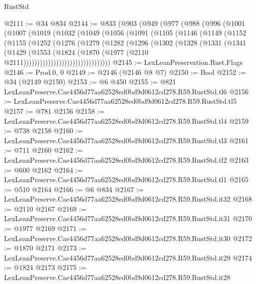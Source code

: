 \begin{lexlean}{RustStd}
\begin{coremodule}
@2111 := @34 @834
@2144 := @833
    (@903
      (@949
        (@977
          (@988
            (@996
              (@1001
                (@1007
                  (@1019
                    (@1032
                      (@1049
                        (@1056
                          (@1091
                            (@1105
                              (@1146
                                (@1149
                                  (@1152
                                    (@1155
                                      (@1252
                                        (@1276
                                          (@1279
                                            (@1282
                                              (@1296
                                                (@1302
                                                  (@1328
                                                    (@1331
                                                      (@1341
                                                        (@1429
                                                          (@1553
                                                            (@1824
                                                              (@1870
                                                                (@1977
                                                                  (@2110
                                                                    @2111))))))))))))))))))))))))))))))))
@2145 := LexLeanPreservation.Rust.Flags
@2146 := Prod.{0, 0}
@2149 := @2146 (@2146 @8 @7)
@2150 := Bool
@2152 := @34 (@2149 @2150)
@2153 := @6 @450
@2155 := @821 LexLeanPreserve.Cae4456d77aa62528ed0bd9d0612cd278.R59.RustStd.tl6
@2156 := LexLeanPreserve.Cae4456d77aa62528ed0bd9d0612cd278.R59.RustStd.tl5
@2157 := @781 @2156
@2158 := LexLeanPreserve.Cae4456d77aa62528ed0bd9d0612cd278.R59.RustStd.tl4
@2159 := @738 @2158
@2160 := LexLeanPreserve.Cae4456d77aa62528ed0bd9d0612cd278.R59.RustStd.tl3
@2161 := @711 @2160
@2162 := LexLeanPreserve.Cae4456d77aa62528ed0bd9d0612cd278.R59.RustStd.tl2
@2163 := @600 @2162
@2164 := LexLeanPreserve.Cae4456d77aa62528ed0bd9d0612cd278.R59.RustStd.tl1
@2165 := @510 @2164
@2166 := @6 @834
@2167 := LexLeanPreserve.Cae4456d77aa62528ed0bd9d0612cd278.R59.RustStd.it32
@2168 := @2110 @2167
@2169 := LexLeanPreserve.Cae4456d77aa62528ed0bd9d0612cd278.R59.RustStd.it31
@2170 := @1977 @2169
@2171 := LexLeanPreserve.Cae4456d77aa62528ed0bd9d0612cd278.R59.RustStd.it30
@2172 := @1870 @2171
@2173 := LexLeanPreserve.Cae4456d77aa62528ed0bd9d0612cd278.R59.RustStd.it29
@2174 := @1824 @2173
@2175 := LexLeanPreserve.Cae4456d77aa62528ed0bd9d0612cd278.R59.RustStd.it28

\end{coremodule}
\end{lexlean}

